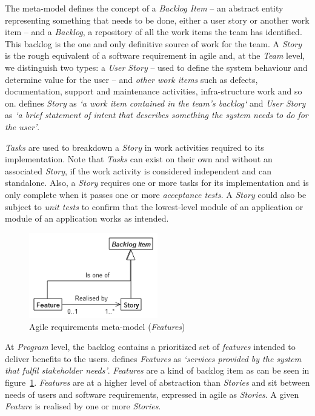 \documentclass[dissertation,final]{softeng}
\begin{document}
The meta-model defines the concept of a \emph{Backlog Item} -- an abstract entity representing something that needs to be done, either a user story or another work item -- and a \emph{Backlog}, a repository of all the work items the team has identified. This backlog is the one and only definitive source of work for the team. A \emph{Story} is the rough equivalent of a software requirement in agile and, at the \emph{Team} level, we distinguish two types: a \emph{User Story} -- used to define the system behaviour and determine value for the user -- and \emph{other work items} such as defects, documentation, support and maintenance activities, infra-structure work and so on. \citet{Leffingwell2011} defines \emph{Story} as \emph{`a work item contained in the team's backlog`} and \emph{User Story} as \emph{`a brief statement of intent that describes something the system needs to do for the user'}.

\emph{Tasks} are used to breakdown a \emph{Story} in work activities required to its implementation. Note that \emph{Tasks} can exist on their own and without an associated \emph{Story}, if the work activity is considered independent and can standalone. Also, a \emph{Story} requires one or more tasks for its implementation and is only complete when it passes one or more \emph{acceptance tests}. A \emph{Story} could also be subject to \emph{unit tests} to confirm that the lowest-level module of an application or module of an application works as intended.

\begin{figure}[!h]
\includegraphics[width=0.50\textwidth]{metamodel_features2}
\centering
\caption{Agile requirements meta-model (\emph{Features})}
\label{fig:metamodel_features}
\end{figure}

At \emph{Program} level, the backlog contains a prioritized set of \emph{features} intended to deliver benefits to the users. \citet{Leffingwell2011} defines \emph{Features} as \emph{`services provided by the system that fulfil stakeholder needs'}. \emph{Features} are a kind of backlog item as can be seen in figure~\ref{fig:metamodel_features}. \emph{Features} are at a higher level of abstraction than \emph{Stories} and sit between needs of users and software requirements, expressed in agile as \emph{Stories}. A given \emph{Feature} is realised by one or more \emph{Stories}.
\end{document}

